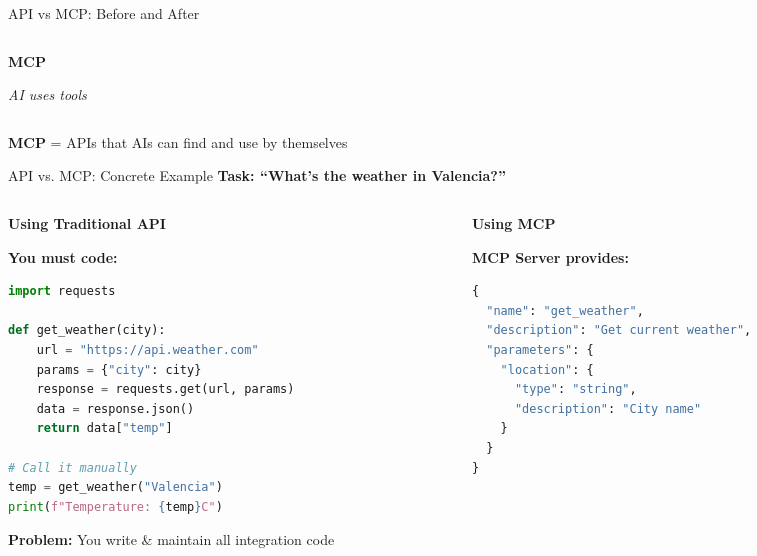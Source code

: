 \documentclass[aspectratio=169]{beamer}
\begin{document}
\begin{frame}{API vs MCP: Before and After}
\begin{columns}[T]
\begin{column}{0.48\textwidth}
      \vspace{0.5cm}
      \textbf{MCP}

      \small
      \textit{AI uses tools}
    \end{column}
  \end{columns}

  \vspace{0.4cm}
  \centering
  \normalsize
  \textbf{MCP} = APIs that AIs can find and use by themselves
\end{frame}

\begin{frame}[fragile]{API vs. MCP: Concrete Example}
  \centering
  \large\bfseries
  Task: ``What's the weather in Valencia?''

  \vspace{0.5cm}

  \begin{columns}[T]
    \begin{column}{0.48\textwidth}
      \centering
      \normalsize\bfseries
      \textcolor{conesaOrange}{Using Traditional API}

      \vspace{0.3cm}
      \small

      \textbf{You must code:}
      \begin{lstlisting}[language=python, basicstyle=\tiny\ttfamily]
import requests

def get_weather(city):
    url = "https://api.weather.com"
    params = {"city": city}
    response = requests.get(url, params)
    data = response.json()
    return data["temp"]

# Call it manually
temp = get_weather("Valencia")
print(f"Temperature: {temp}C")
      \end{lstlisting}

      \vspace{0.2cm}
      \textbf{Problem:} You write \& maintain all integration code
    \end{column}
    \begin{column}{0.48\textwidth}
      \centering
      \normalsize\bfseries
      \textcolor{conesaTeal}{Using MCP}

      \vspace{0.3cm}
      \small

      \textbf{MCP Server provides:}
      \begin{lstlisting}[language=python, basicstyle=\tiny\ttfamily]
{
  "name": "get_weather",
  "description": "Get current weather",
  "parameters": {
    "location": {
      "type": "string",
      "description": "City name"
    }
  }
}
      \end{lstlisting}


\end{column}
\end{columns}
\end{frame}
\end{document}
